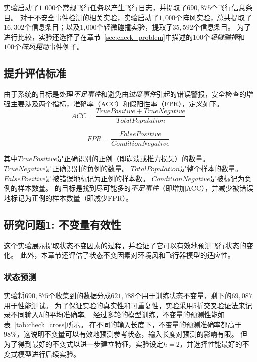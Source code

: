 实验启动了$1,000$个常规飞行任务以产生飞行日志，并提取了$690,875$个飞行信息条目。
对于不安全事件检测的相关实验，实验启动了$1,000$个阵风实验，总共提取了$16,302$个信息条目；以及$1,000$个轻微碰撞实验，提取了$35,592$个信息条目。
为了进行比较，实验还选择了在章节~\ref{sec:check_problem}中描述的$100$个\emph{轻微碰撞}和$100$个\emph{阵风晃动}事件例子。


\subsection{提升评估标准}
由于系统的目标是处理\emph{不足事件}和避免由\emph{过度事件}引起的错误警报，安全检查的增强主要涉及两个指标，准确率（ACC）和假阳性率（FPR），定义如下。
\begin{equation}
    ACC = \frac{ TruePositive +  TrueNegative}{TotalPopulation}
\end{equation}

\begin{equation}
    FPR = \frac{FalsePositive}{ConditionNegative}
\end{equation}

其中$TruePositive$是正确识别的正例（即崩溃或推力损失）的数量。
    $TrueNegative$是正确识别的负例的数量。
    $TotalPopulation$是整个样本的数量。
    $FalsePositive$是被错误地标记为正例的样本数。
    $ConditionNegative$是被标记为负例的样本数量。
\deccheck 的目标是找到尽可能多的\emph{不足事件}（即增加ACC），并减少被错误地标记为正例的样本数量（即减少FPR）。


\subsection{研究问题1: 不变量有效性}
这个实验展示提取状态不变因素的过程，并验证了它可以有效地预测飞行状态的变化。
此外，本章节还评估了状态不变因素对环境风和飞行器模型的适应性。

\subsubsection{状态预测}
实验将$690,875$个收集到的数据分成$621,788$个用于训练状态不变量，剩下的$69,087$用于性能测试。
为了保证实验的真实性和可重复性，实验采用5折交叉验证法来记录不同输入$h$的平均准确率。
经过多轮的模型训练，不变量的预测性能如表~\ref{tab:check_cross}所示。
在不同的输入长度下，不变量的预测准确率都高于$98\%$，这说明不变量可以有效地预测参考状态，输入长度对预测的影响有限。
但为了得到最好的不变式以进一步建立特征，实验设定$h=2$，并选择性能最好的不变式模型进行后续实验。

